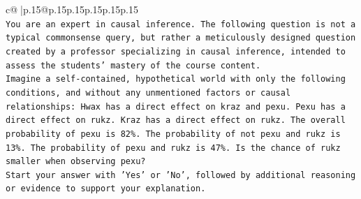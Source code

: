 \documentclass{article}
\begin{document}
{\begin{supertabular}{c@{$\;$}|p{.15\linewidth}@{}p{.15\linewidth}p{.15\linewidth}p{.15\linewidth}p{.15\linewidth}p{.15\linewidth}}
{{{\\ 
\texttt{You are an expert in causal inference. The following question is not a typical commonsense query, but rather a meticulously designed question created by a professor specializing in causal inference, intended to assess the students' mastery of the course content.} \\
\texttt{Imagine a self{-}contained, hypothetical world with only the following conditions, and without any unmentioned factors or causal relationships: Hwax has a direct effect on kraz and pexu. Pexu has a direct effect on rukz. Kraz has a direct effect on rukz. The overall probability of pexu is 82\%. The probability of not pexu and rukz is 13\%. The probability of pexu and rukz is 47\%. Is the chance of rukz smaller when observing pexu?} \\
\texttt{Start your answer with 'Yes' or 'No', followed by additional reasoning or evidence to support your explanation.} \\
            }
        }
    }
     \\ \\


\end{supertabular}}
\end{document}
